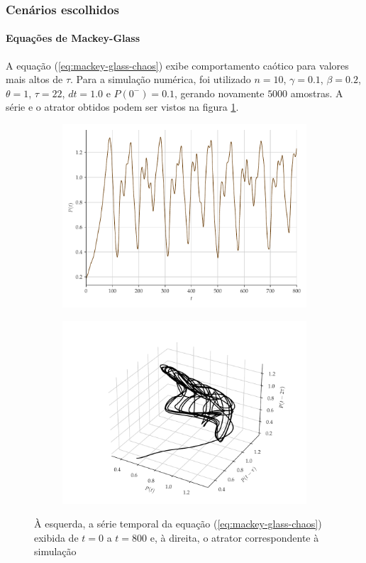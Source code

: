 \documentclass{beamer}
\begin{document}
\begin{frame}
	\frametitle{Cenários escolhidos}
	\framesubtitle{Equações de Mackey-Glass}
\justifying A equação (\ref{eq:mackey-glass-chaos}) exibe comportamento caótico para valores mais altos de $\tau$. Para a simulação numérica, foi utilizado $n = 10$, $\gamma = 0.1$, $\beta = 0.2$, $\theta = 1$, $\tau = 22$, $dt = 1.0$ e $P(0^-)=0.1$, gerando novamente $5000$ amostras. A série e o atrator obtidos podem ser vistos na figura \ref{fig:mackey-glass}.
\begin{figure}[H]
     \begin{subfigure}[t]{0.3\textwidth}
         \includegraphics[scale=0.2]{serie-mackeyglass.pdf}
     \end{subfigure}
     \centering
     \begin{subfigure}[t]{0.3\textwidth}
         \includegraphics[scale=0.2]{atrator-mackeyglass.pdf}
     \end{subfigure}
     \caption{À esquerda, a série temporal da equação (\ref{eq:mackey-glass-chaos}) exibida de $t = 0 $ a $t = 800$ e, à direita, o atrator correspondente à simulação}
     \label{fig:mackey-glass}
\end{figure}
\end{frame}
\end{document}
